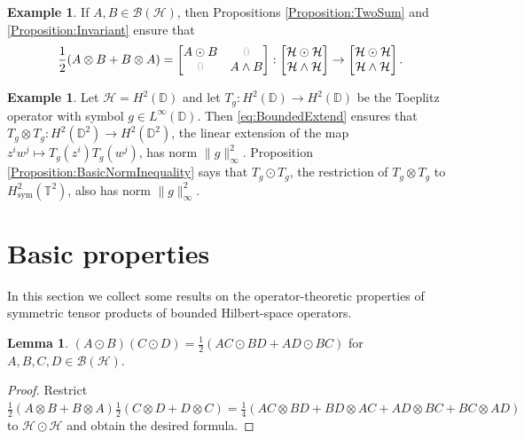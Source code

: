 \documentclass[10pt,reqno]{amsart}
\newcommand{\0}{{\color{lightgray}0}}
\newcommand{\D}{\mathbb{D}}
\newcommand{\B}{\mathcal{B}}
\newcommand{\h}{\mathcal{H}}
\newcommand{\T}{\mathbb{T}}
\theoremstyle{definition}
\newtheorem{Lemma}[equation]{Lemma}
\newtheorem{Example}[equation]{Example}
\numberwithin{equation}{section}
\begin{document}
\begin{Example}
If $A,B \in \B(\h)$, then Propositions  \ref{Proposition:TwoSum} and \ref{Proposition:Invariant} ensure that
\begin{equation}\label{eq:UseLots}
    \frac{1}{2}( A \otimes B + B \otimes A) 
    = 
\begin{bmatrix}
A \odot B & \0 \\
\0 & A \wedge B \\
\end{bmatrix} : 
\begin{bmatrix}
\h \odot \h \\
\h \wedge \h
\end{bmatrix} \to 
\begin{bmatrix}
\h \odot \h \\
\h \wedge \h
\end{bmatrix}.
\end{equation}
\end{Example}


\begin{Example}
Let $\h = H^2( \D)$ and let $T_g: H^2(\D) \to H^2( \D)$ be the Toeplitz operator with symbol $g \in L^{\infty}(\D)$. 
Then \eqref{eq:BoundedExtend} ensures that $T_{g} \otimes T_{g} : H^2(\D^2) \to H^2(\D^2)$, the linear extension
of the map $z^i w^j \mapsto T_{g}(z^i) T_{g}(w^j)$, has norm $\|g\|_{\infty}^2$. 
Proposition \ref{Proposition:BasicNormInequality} says that $T_{g} \odot T_{g}$, the restriction of $T_{g} \otimes T_{g}$ to $H^2_{\operatorname{sym}}(\T^2)$, also has norm $\|g\|_{\infty}^2$.
\end{Example}


\section{Basic properties}\label{Section:Basic}
In this section we collect some results on the operator-theoretic properties of symmetric tensor products of bounded Hilbert-space operators.



\begin{Lemma}\label{prodsym}
$(A \odot B)(C\odot D)=\frac{1}{2}(AC\odot BD+AD\odot BC)$
for $A,B,C,D \in \B(\mathcal{\h})$.
\end{Lemma}

\begin{proof}
Restrict
$\frac{1}{2} (A\otimes B+B\otimes A ) \frac{1}{2} (C\otimes D+D\otimes C)
= \frac{1}{4}(AC \otimes BD+ BD \otimes AC+ AD \otimes BC+ BC \otimes AD)$
to $\h \odot \h$ and obtain the desired formula.
\end{proof}
\end{document}
